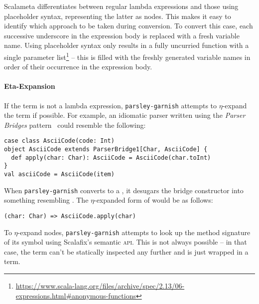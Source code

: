 \documentclass[../../main.tex]{subfiles}
\begin{document}
Scalameta differentiates between regular lambda expressions and those using placeholder syntax, representing the latter as  nodes.
This makes it easy to identify which approach to be taken during conversion.
To convert this case, each successive underscore in the expression body is replaced with a fresh variable name.
Using placeholder syntax only results in a fully uncurried function with a single parameter list\footnote{\url{https://www.scala-lang.org/files/archive/spec/2.13/06-expressions.html#anonymous-functions}} -- this is filled with the freshly generated variable names in order of their occurrence in the expression body.

\paragraph{Eta-Expansion}
If the term is not a lambda expression, \texttt{parsley-garnish} attempts to $\eta$-expand the term if possible.
For example, an idiomatic parser written using the \emph{Parser Bridges} pattern~\cite{willis_design_2022} could resemble the following:
\begin{verbatim}
case class AsciiCode(code: Int)
object AsciiCode extends ParserBridge1[Char, AsciiCode] {
  def apply(char: Char): AsciiCode = AsciiCode(char.toInt)
}
val asciiCode = AsciiCode(item)
\end{verbatim}
%
When \texttt{parsley-garnish} converts  to a , it desugars the bridge constructor into something resembling .
The $\eta$-expanded form of  would be as follows:
\begin{verbatim}
(char: Char) => AsciiCode.apply(char)
\end{verbatim}
%
To $\eta$-expand  nodes, \texttt{parsley-garnish} attempts to look up the method signature of its symbol using Scalafix's semantic \textsc{api}.
This is not always possible -- in that case, the term can't be statically inspected any further and is just wrapped in a  term.
\end{document}
